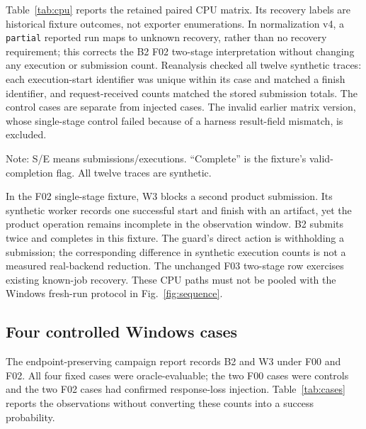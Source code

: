 \documentclass[conference,letterpaper,10pt]{IEEEtran}
\begin{document}
Table~\ref{tab:cpu} reports the retained paired CPU matrix. Its recovery labels
are historical fixture outcomes, not exporter enumerations. In normalization v4,
a \texttt{partial} reported run maps to unknown recovery, rather than no recovery
requirement; this corrects the B2 F02 two-stage interpretation without changing
any execution or submission count. Reanalysis checked
all twelve synthetic traces: each execution-start identifier was unique within
its case and matched a finish identifier, and request-received counts matched
the stored submission totals. The control cases are separate from injected
cases. The invalid earlier matrix version, whose single-stage control failed
because of a harness result-field mismatch, is excluded.

\begin{table}[t]
\caption{Deterministic CPU fault coverage from the retained paired-v2 matrix.}
\label{tab:cpu}
\centering

\par\smallskip
\begin{minipage}{0.8\textwidth}\footnotesize\raggedright
Note: S/E means submissions/executions. ``Complete'' is the fixture's
valid-completion flag. All twelve traces are synthetic.
\end{minipage}
\end{table}

In the F02 single-stage fixture, W3 blocks a second product submission. Its
synthetic worker records one successful start
and finish with an artifact, yet the product operation remains incomplete in
the observation window. B2 submits twice and completes in this fixture. The
guard's direct action is withholding a submission; the corresponding difference
in synthetic execution counts is not a measured real-backend reduction. The
unchanged F03 two-stage row exercises existing known-job recovery. These CPU
paths must not be pooled with the Windows fresh-run protocol in
Fig.~\ref{fig:sequence}.

\subsection{Four controlled Windows cases}

The endpoint-preserving campaign report records B2 and W3 under F00 and F02. All four fixed cases were oracle-evaluable; the two F00 cases were controls
and the two F02 cases had confirmed response-loss injection. Table~\ref{tab:cases} reports
the observations without converting these counts into a success probability.
\end{document}

